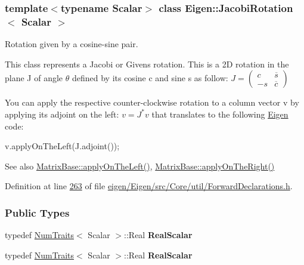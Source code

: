 \subsubsection*{template$<$typename Scalar$>$\newline
class Eigen\+::\+Jacobi\+Rotation$<$ Scalar $>$}

Rotation given by a cosine-\/sine pair. 

This class represents a Jacobi or Givens rotation. This is a 2D rotation in the plane {\ttfamily J} of angle $ \theta $ defined by its cosine {\ttfamily c} and sine {\ttfamily s} as follow\+: $ J = \left ( \begin{array}{cc} c & \overline s \\ -s & \overline c \end{array} \right ) $

You can apply the respective counter-\/clockwise rotation to a column vector {\ttfamily v} by applying its adjoint on the left\+: $ v = J^* v $ that translates to the following \hyperlink{namespace_eigen}{Eigen} code\+: 
\begin{DoxyCode}
v.applyOnTheLeft(J.adjoint());
\end{DoxyCode}


\begin{DoxySeeAlso}{See also}
\hyperlink{group___core___module_a3a08ad41e81d8ad4a37b5d5c7490e765}{Matrix\+Base\+::apply\+On\+The\+Left()}, \hyperlink{group___core___module_a45d91752925d2757fc8058a293b15462}{Matrix\+Base\+::apply\+On\+The\+Right()} 
\end{DoxySeeAlso}


Definition at line \hyperlink{eigen_2_eigen_2src_2_core_2util_2_forward_declarations_8h_source_l00263}{263} of file \hyperlink{eigen_2_eigen_2src_2_core_2util_2_forward_declarations_8h_source}{eigen/\+Eigen/src/\+Core/util/\+Forward\+Declarations.\+h}.

\subsubsection*{Public Types}
\begin{DoxyCompactItemize}
\item 
\mbox{\label{group___jacobi___module_a8d15e6a99740aecb64b3c639e8fb2856}} 
typedef \hyperlink{group___core___module_struct_eigen_1_1_num_traits}{Num\+Traits}$<$ Scalar $>$\+::Real {\bfseries Real\+Scalar}
\item 
\mbox{\label{group___jacobi___module_a8d15e6a99740aecb64b3c639e8fb2856}} 
typedef \hyperlink{group___core___module_struct_eigen_1_1_num_traits}{Num\+Traits}$<$ Scalar $>$\+::Real {\bfseries Real\+Scalar}
\end{DoxyCompactItemize}
